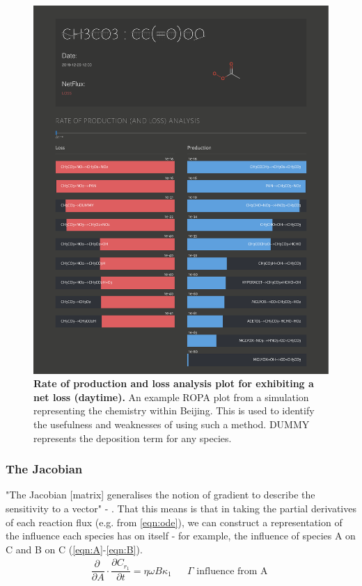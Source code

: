 \begin{figure}[H]
     \centering
         \includegraphics[width=\textwidth]{figures/ROPA_CH3CO3.pdf}
        \caption{\textbf{Rate of production and loss analysis plot for  exhibiting a net loss (daytime).} An example ROPA plot from a simulation representing the chemistry within Beijing. This is used to identify the usefulness and weaknesses of using such a method. DUMMY represents the deposition term for any species. }
        \label{fig:ropa_day}
\end{figure}
\newpage



\subsubsection{The Jacobian}
"The Jacobian [matrix] generalises the notion of gradient to describe the sensitivity to a vector" - \cite{jacob}. That this means is that in taking the partial derivatives of each reaction flux (e.g. from \autoref{eqn:ode}), we can construct a representation of the influence each species has on itself - for example, the influence of species A on C and B on C (\autoref{eqn:A}-\ref{eqn:B}).
\begin{eqnarray}
   \dfrac{\partial \ }{\partial A}\cdot \dfrac{\partial C_{r_1}}{\partial t} = \eta \omega B \kappa_1 & & \Gamma \text{ influence from A }\label{eqn:A}%
\end{eqnarray}

